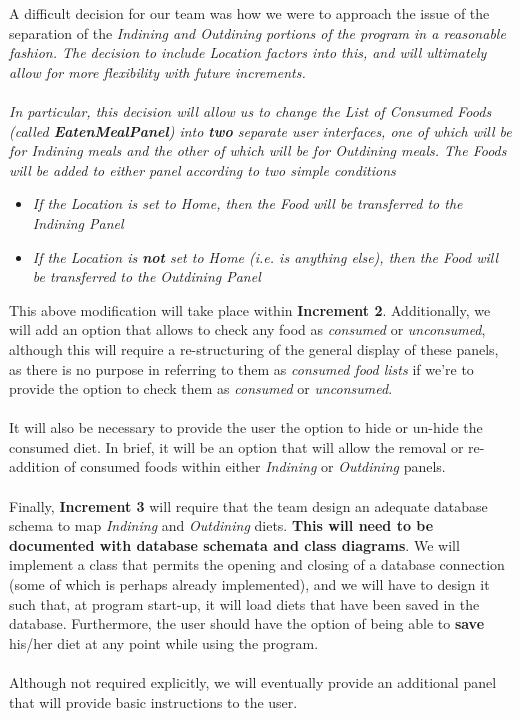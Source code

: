 \documentclass{article}
\begin{document}
A difficult decision for our team was how we were to approach the issue of the separation of the \em Indining \em and \em Outdining \em portions of the program in a reasonable fashion. The decision to include Location factors into this, and will ultimately allow for more flexibility with future increments.
\\\\
In particular, this decision will allow us to change the \textit{List of Consumed Foods} (called \textbf{EatenMealPanel}) into \textbf{two} separate user interfaces, one of which will be for \em Indining \em meals and the other of which will be for \em Outdining \em meals. The Foods will be added to either panel according to two simple conditions

\begin{itemize}
    \item \em If \em the Location is set to Home, \em then \em the Food will be transferred to the Indining Panel
    \item \em If \em the Location is \textbf{not} set to Home (i.e. is anything else), \em then \em the Food will be transferred to the Outdining Panel\\
\end{itemize}
This above modification will take place within \textbf{Increment 2}. Additionally, we will add an option that allows to check any food as \textit{consumed} or \textit{unconsumed}, although this will require a re-structuring of the general display of these panels, as there is no purpose in referring to them as \textit{consumed food lists} if we're to provide the option to check them as \textit{consumed} or \textit{unconsumed}.
\\\\
It will also be necessary to provide the user the option to hide or un-hide the consumed diet. In brief, it will be an option that will allow the removal or re-addition of consumed foods within either \textit{Indining} or \textit{Outdining} panels.
\\\\
Finally, \textbf{Increment 3} will require that the team design an adequate database schema to map \textit{Indining} and \textit{Outdining} diets. \textbf{This will need to be documented with database schemata and class diagrams}. We will implement a class that permits the opening and closing of a database connection (some of which is perhaps already implemented), and we will have to design it such that, at program start-up, it will load diets that have been saved in the database. Furthermore, the user should have the option of being able to \textbf{save} his/her diet at any point while using the program.
\\\\
Although not required explicitly, we will eventually provide an additional panel that will provide basic instructions to the user.
\\
\end{document}
